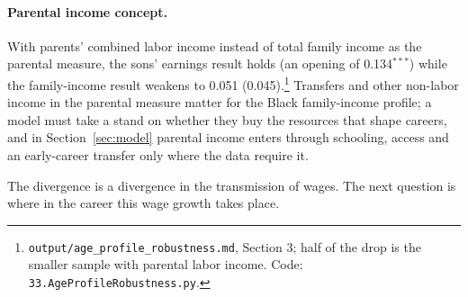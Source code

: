 \paragraph{Parental income concept.} With parents' combined labor income instead of total family income as the
parental measure, the sons' earnings result holds (an opening of 0.134$^{***}$) while the family-income result weakens
to 0.051 (0.045).\footnote{\texttt{output/age\_profile\_robustness.md}, Section 3; half of the drop is the smaller
sample with parental labor income. Code: \texttt{33.AgeProfileRobustness.py}.} Transfers and other non-labor
income in the parental measure matter for the Black family-income profile; a model must take a stand on whether they
buy the resources that shape careers, and in Section~\ref{sec:model} parental income enters through schooling, access
and an early-career transfer only where the data require it.

The divergence is a divergence in the transmission of wages. The next question is where in the career this wage
growth takes place.
